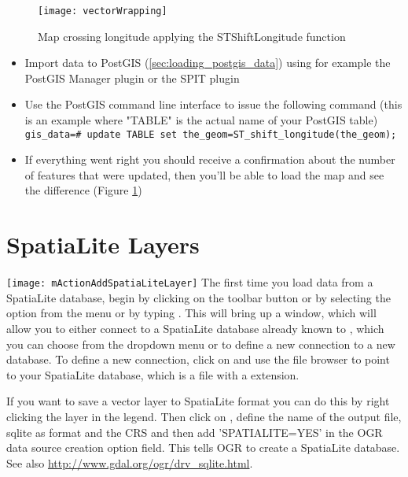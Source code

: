 \begin{figure}[ht]
   \centering
   \texttt{[image: vectorWrapping]}
   \caption{Map crossing  longitude applying the ST\textunderscore Shift\textunderscore Longitude function \nixcaption}
\label{fig:vector_wrapping}
\end{figure}


\begin{itemize}[label=--]
\item Import data to PostGIS (\ref{sec:loading_postgis_data}) using for
example the PostGIS Manager plugin or the SPIT plugin
\item Use the PostGIS command line interface to issue the following command
(this is an example where "TABLE" is the actual name of your PostGIS table) \\
\texttt{gis\_data=\# update TABLE set the\_geom=ST\_shift\_longitude(the\_geom);}
\item If everything went right you should receive a confirmation about the
number of features that were updated, then you'll be able to load the map and
see the difference (Figure \ref{fig:vector_wrapping})
\end{itemize}

\section{SpatiaLite Layers}
\label{label_spatialite}

\texttt{[image: mActionAddSpatiaLiteLayer]}
The first time you load data from a SpatiaLite database, begin by clicking on the
 toolbar button or by selecting the
option from the  menu or by typing .
This will bring up a window, which will allow you to either connect to a SpatiaLite 
database already known to \qg, which you can choose from the dropdown menu or to define 
a new connection to a new database. To define a new connection, click on  and 
use the file browser to point to your SpatiaLite database, which is a file with 
a  extension.

If you want to save a vector layer to SpatiaLite format you can do this by right clicking
the layer in the legend. Then click on , define the name of the output 
file, sqlite as format and the CRS and then add 'SPATIALITE=YES' in the OGR data source 
creation option field. This tells OGR to create a SpatiaLite database. See 
also \url{http://www.gdal.org/ogr/drv_sqlite.html}.

